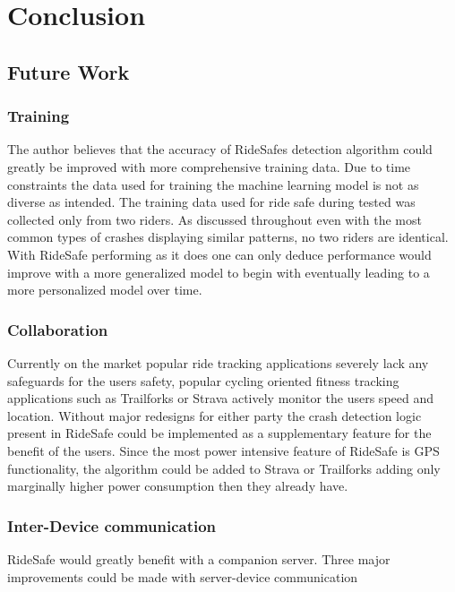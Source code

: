 \chapter{Conclusion}

\section {Future Work}

\subsection {Training}

The author believes that the accuracy of RideSafes detection algorithm could greatly be improved with more comprehensive training data. Due to time constraints the data used for training the machine learning model is not as diverse as intended. The training data used for ride safe during tested was collected only from two riders. As discussed throughout even with the most common types of crashes displaying similar patterns, no two riders are identical.   With RideSafe performing as it does one can only deduce performance would improve with a more generalized model to begin with eventually leading to a more personalized model over time.





\subsection {Collaboration}

Currently on the market popular ride tracking applications severely lack  any safeguards for the users safety, popular cycling oriented fitness tracking applications such as Trailforks or Strava actively monitor the users speed and location. Without major redesigns for either party the crash detection logic present in RideSafe could be implemented as a supplementary feature for the benefit of the users. Since the most power intensive feature of RideSafe is GPS functionality, the algorithm could be added to Strava or Trailforks adding only marginally higher power consumption then they already have.




\subsection {Inter-Device communication}
RideSafe would greatly benefit with a companion server. Three major improvements could be made with server-device communication 


